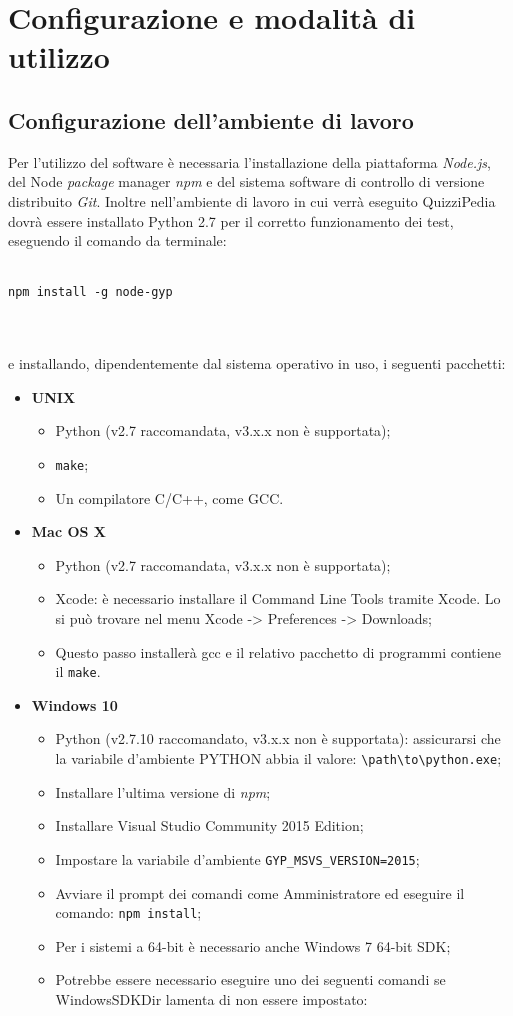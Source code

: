 \newpage
\section{Configurazione e modalità di utilizzo}
\subsection{Configurazione dell'ambiente di lavoro}
Per l'utilizzo del software è necessaria l'installazione della piattaforma \textit{Node.js}, del Node \textit{package} manager \textit{npm} e del sistema software di controllo di versione distribuito \textit{Git}. 
Inoltre nell'ambiente di lavoro in cui verrà eseguito QuizziPedia dovrà essere installato Python 2.7 per il corretto funzionamento dei test, eseguendo il comando da terminale:\\
\\
\centerline{\texttt{npm install -g node-gyp}}\\
\\
e installando, dipendentemente dal sistema operativo in uso, i seguenti pacchetti:
\begin{itemize}
	\item \textbf{UNIX}
	\begin{itemize}
		\item Python (v2.7 raccomandata, v3.x.x non è supportata);
		\item \texttt{make};
		\item Un compilatore C/C++, come GCC.
	\end{itemize}
	\item \textbf{Mac OS X}
	\begin{itemize}
		\item Python (v2.7 raccomandata, v3.x.x non è supportata);
		\item Xcode: è necessario installare il Command Line Tools tramite Xcode. Lo si può trovare nel menu Xcode -> Preferences -> Downloads;
		\item Questo passo installerà gcc e il relativo pacchetto di programmi contiene il \texttt{make}.
	\end{itemize}
	\item \textbf{Windows 10}
	\begin{itemize}
		\item Python (v2.7.10 raccomandato, v3.x.x non è supportata): assicurarsi che la variabile d'ambiente PYTHON abbia il valore: \verb|\path\to\python.exe|;
		\item Installare l'ultima versione di \textit{npm};
		\item Installare Visual Studio Community 2015 Edition;
		\item Impostare la variabile d'ambiente \verb|GYP_MSVS_VERSION=2015|;
		\item Avviare il prompt dei comandi come Amministratore ed eseguire il comando: \texttt{npm install};
		\item Per i sistemi a 64-bit è necessario anche Windows 7 64-bit SDK;
		\item Potrebbe essere necessario eseguire uno dei seguenti comandi se WindowsSDKDir lamenta di non essere impostato:
	\end{itemize}
\end{itemize}
